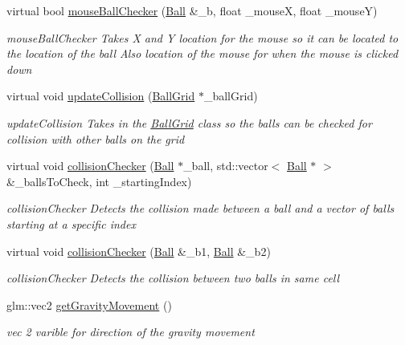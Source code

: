 \begin{DoxyCompactItemize}
virtual bool \hyperlink{classBallControl_a85fce07250ce552fd098b6c74d34c588}{mouseBallChecker} (\hyperlink{structBall}{Ball} \&\_\-b, float \_\-mouseX, float \_\-mouseY)
\begin{DoxyCompactList}\small\item\em mouseBallChecker Takes X and Y location for the mouse so it can be located to the location of the ball Also location of the mouse for when the mouse is clicked down \item\end{DoxyCompactList}\item 
virtual void \hyperlink{classBallControl_a352ac9ed1ddedb11892e92ea75e1d171}{updateCollision} (\hyperlink{classBallGrid}{BallGrid} $\ast$\_\-ballGrid)
\begin{DoxyCompactList}\small\item\em updateCollision Takes in the \hyperlink{classBallGrid}{BallGrid} class so the balls can be checked for collision with other balls on the grid \item\end{DoxyCompactList}\item 
virtual void \hyperlink{classBallControl_af84eaea1411dd325db8e94c7adc5d9a3}{collisionChecker} (\hyperlink{structBall}{Ball} $\ast$\_\-ball, std::vector$<$ \hyperlink{structBall}{Ball} $\ast$ $>$ \&\_\-ballsToCheck, int \_\-startingIndex)
\begin{DoxyCompactList}\small\item\em collisionChecker Detects the collision made between a ball and a vector of balls starting at a specific index \item\end{DoxyCompactList}\item 
virtual void \hyperlink{classBallControl_a062a70454845cbf25fe7f15554676ab9}{collisionChecker} (\hyperlink{structBall}{Ball} \&\_\-b1, \hyperlink{structBall}{Ball} \&\_\-b2)
\begin{DoxyCompactList}\small\item\em collisionChecker Detects the collision between two balls in same cell \item\end{DoxyCompactList}\item 
\hypertarget{classBallControl_a6eb0d955ccad645cd5d8865c3bd899a7}{
glm::vec2 \hyperlink{classBallControl_a6eb0d955ccad645cd5d8865c3bd899a7}{getGravityMovement} ()}
\label{classBallControl_a6eb0d955ccad645cd5d8865c3bd899a7}

\begin{DoxyCompactList}\small\item\em vec 2 varible for direction of the gravity movement \item\end{DoxyCompactList}\end{DoxyCompactItemize}
